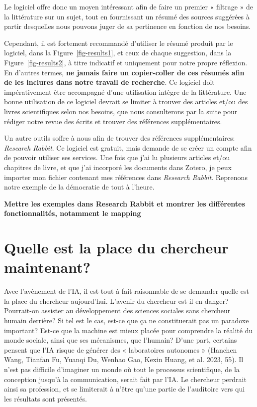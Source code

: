 \documentclass[
  letterpaper,
]{scrbook}
\begin{document}
Le logiciel offre donc un moyen intéressant afin de faire un premier «
filtrage » de la littérature sur un sujet, tout en fournissant un résumé
des sources suggérées à partir desquelles nous pouvons juger de sa
pertinence en fonction de nos besoins.

Cependant, il est fortement recommandé d'utiliser le résumé produit par
le logiciel, dans la Figure~\ref{fig-results1}, et ceux de chaque
suggestion, dans la Figure~\ref{fig-results2}, à titre indicatif et
uniquement pour notre propre réflexion. En d'autres termes, \textbf{ne
jamais faire un copier-coller de ces résumés afin de les inclures dans
notre travail de recherche}. Ce logiciel doit impérativement être
accompagné d'une utilisation intègre de la littérature. Une bonne
utilisation de ce logiciel devrait se limiter à trouver des articles
et/ou des livres scientifiques selon nos besoins, que nous consulterons
par la suite pour rédiger notre revue des écrits et trouver des
références supplémentaires.

Un autre outils soffre à nous afin de trouver des références
supplémentaires: \emph{Research Rabbit}. Ce logiciel est gratuit, mais
demande de se créer un compte afin de pouvoir utiliser ses services. Une
fois que j'ai lu plusieurs articles et/ou chapitres de livre, et que
j'ai incorporé les documents dans Zotero, je peux importer mon fichier
contenant mes références dans \emph{Research Rabbit}. Reprenons notre
exemple de la démocratie de tout à l'heure.

\textbf{Mettre les exemples dans Research Rabbit et montrer les
différentes fonctionnalités, notamment le mapping}

\hypertarget{quelle-est-la-place-du-chercheur-maintenant}{%
\section{Quelle est la place du chercheur
maintenant?}\label{quelle-est-la-place-du-chercheur-maintenant}}

Avec l'avènement de l'IA, il est tout à fait raisonnable de se demander
quelle est la place du chercheur aujourd'hui. L'avenir du chercheur
est-il en danger? Pourrait-on assister au développement des sciences
sociales sans chercheur humain derrière? Si tel est le cas, est-ce que
ça ne constituerait pas un paradoxe important? Est-ce que la machine est
mieux placée pour comprendre la réalité du monde sociale, ainsi que ses
mécanismes, que l'humain? D'une part, certains pensent que l'IA risque
de générer des « laboratoires autonomes » (Hanchen Wang, Tianfan Fu,
Yuanqi Du, Wenhao Gao, Kexin Huang, et al. 2023, 55). Il n'est pas
difficile d'imaginer un monde où tout le processus scientifique, de la
conception jusqu'à la communication, serait fait par l'IA. Le chercheur
perdrait ainsi sa profession, et se limiterait à n'être qu'une partie de
l'auditoire vers qui les résultats sont présentés.
\end{document}
